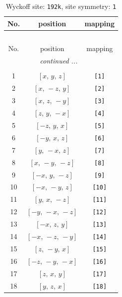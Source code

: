 \documentclass[fleqn,8pt]{jsarticle}
\begin{document}
\begin{longtable}{ccc}
\caption{Wyckoff site: {\tt 192k}, site symmetry: {\tt 1}}
 \\
 \hline \hline
No. & position & mapping \\ \hline \endfirsthead

\multicolumn{2}{l}{\tablename\ \thetable{}} \\
 \hline \hline
No. & position & mapping \\ \hline \endhead

 \hline \hline
\multicolumn{2}{r}{\footnotesize\it continued ...} \\ \endfoot

 \hline \hline
\multicolumn{2}{r}{} \\ \endlastfoot

1 & $\left[ x,\, y,\, z \right]$ & {\tt [1]} \\ \hline
2 & $\left[ x,\, - z,\, y \right]$ & {\tt [2]} \\ \hline
3 & $\left[ x,\, z,\, - y \right]$ & {\tt [3]} \\ \hline
4 & $\left[ z,\, y,\, - x \right]$ & {\tt [4]} \\ \hline
5 & $\left[ - z,\, y,\, x \right]$ & {\tt [5]} \\ \hline
6 & $\left[ - y,\, x,\, z \right]$ & {\tt [6]} \\ \hline
7 & $\left[ y,\, - x,\, z \right]$ & {\tt [7]} \\ \hline
8 & $\left[ x,\, - y,\, - z \right]$ & {\tt [8]} \\ \hline
9 & $\left[ - x,\, y,\, - z \right]$ & {\tt [9]} \\ \hline
10 & $\left[ - x,\, - y,\, z \right]$ & {\tt [10]} \\ \hline
11 & $\left[ y,\, x,\, - z \right]$ & {\tt [11]} \\ \hline
12 & $\left[ - y,\, - x,\, - z \right]$ & {\tt [12]} \\ \hline
13 & $\left[ - x,\, z,\, y \right]$ & {\tt [13]} \\ \hline
14 & $\left[ - x,\, - z,\, - y \right]$ & {\tt [14]} \\ \hline
15 & $\left[ z,\, - y,\, x \right]$ & {\tt [15]} \\ \hline
16 & $\left[ - z,\, - y,\, - x \right]$ & {\tt [16]} \\ \hline
17 & $\left[ z,\, x,\, y \right]$ & {\tt [17]} \\ \hline
18 & $\left[ y,\, z,\, x \right]$ & {\tt [18]} \\ \hline

\end{longtable}
\end{document}
